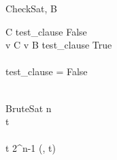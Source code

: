 

\begin{pseudocode}{CheckSat}{\phi, B}

	\FOREACH {} C  \phi \DO
		\BEGIN
			test\_clause \GETS False \\
		
			\FOREACH {} v  C \DO
				\BEGIN
					\IF v \in B 
						\THEN test\_clause \GETS True \\
				\END \\
			\IF test\_clause = False
				\THEN {} \\
		\END \\
\end{pseudocode}

\begin{pseudocode}{BruteSat}{\phi}
	n \phi \\
	t   \\
\\
	\FOR t   2^n-1 \DO
		\BEGIN
			\IF {}(\phi, t) 
				\THEN	{} \\

		\END \\
\end{pseudocode}